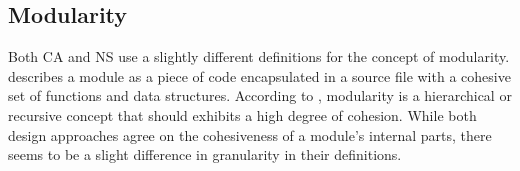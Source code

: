 \subsection{Modularity} \label{subsec_modularity}

Both CA and NS use a slightly different definitions for the concept of modularity.
\textcite[82]{robert_c_martin_clean_2018} describes a module as a piece of code
encapsulated in a source file with a cohesive set of functions and data structures.
According to \textcite[22]{mannaert_normalized_2016}, modularity is a hierarchical or
recursive concept that should exhibits a high degree of cohesion. While both design
approaches agree on the cohesiveness of a module's internal parts, there seems to be a
slight difference in granularity in their definitions.